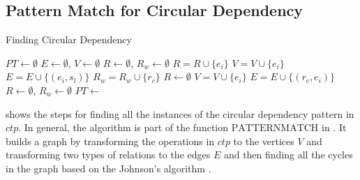 \subsection{Pattern Match for Circular Dependency}

\begin{algorithm}
\caption{Finding Circular Dependency}\label{algo:circular}
\begin{algorithmic}[1]
\State $\mathit{PT} \gets \emptyset$
\State $\mathit{E} \gets \emptyset$, $\mathit{V} \gets \emptyset$
\State $\mathit{R} \gets \emptyset$, $\mathit{R_w} \gets \emptyset$
\State $\mathit{R} = \mathit{R} \cup \{\mathit{e_i}\}$
\State $\mathit{V} = \mathit{V} \cup \{\mathit{e_i}\}$
 
\State $\mathit{E} = \mathit{E} \cup \{(\mathit{e_i},\mathit{s_l})\}$  
\EndFor
\EndIf
{}
\State $\mathit{R_w} = \mathit{R_w} \cup \{\mathit{r_c}\}$
\EndFor
\State $\mathit{R} \gets \emptyset$ 
\EndIf
{}
\State $\mathit{V} = \mathit{V} \cup \{\mathit{e_i}\}$
  
\State $\mathit{E} = \mathit{E} \cup \{(\mathit{r_c},\mathit{e_i})\}$
\EndFor
\EndIf
\EndFor
\State $\mathit{R} \gets \emptyset$, $\mathit{R_w} \gets \emptyset$
\EndFor
\State $\mathit{PT} \gets$ 
\end{algorithmic}
\end{algorithm}

 shows the steps for finding all the instances of the circular dependency pattern in $\mathit{ctp}$. In general, the algorithm is part of the function $\mathrm{PATTERNMATCH}$ in . It builds a graph by transforming the operations in $\mathit{ctp}$ to the vertices $\mathit{V}$ and transforming two types of relations to the edges $\mathit{E}$ and then finding all the cycles in the graph based on the Johnson's algorithm \cite{DBLP:journals/siamcomp/Johnson75}.
 
